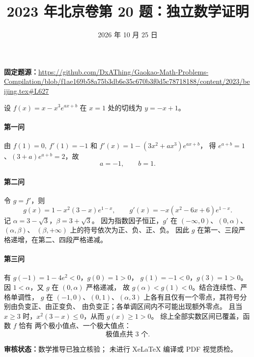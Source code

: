 \documentclass[UTF8,a4paper,11pt]{ctexart}
\title{2023 年北京卷第 20 题：独立数学证明}
\date{2026 年 10 月 25 日}
\begin{document}
\maketitle
\noindent\textbf{固定题源：}\url{https://github.com/DxAThing/Gaokao-Math-Problems-Compilation/blob/f1ae169b58a75b3db6e35c670b3f0d5c78718188/content/2023/beijing.tex#L627}

设 $f(x)=x-x^3e^{ax+b}$ 在 $x=1$ 处的切线为 $y=-x+1$。
\paragraph{第一问}
由 $f(1)=0,\ f'(1)=-1$ 和
$f'(x)=1-(3x^2+ax^3)e^{ax+b}$，
得 $e^{a+b}=1$、$(3+a)e^{a+b}=2$，故
\[\boxed{a=-1,\qquad b=1}.\]
\paragraph{第二问}
令 $g=f'$，则
\[
g(x)=1-x^2(3-x)e^{1-x},\qquad
g'(x)=-x(x^2-6x+6)e^{1-x}.
\]
记 $\alpha=3-\sqrt3$，$\beta=3+\sqrt3$。
因为指数因子恒正，$g'$ 在
$(-\infty,0)$、$(0,\alpha)$、$(\alpha,\beta)$、
$(\beta,+\infty)$ 上的符号依次为正、负、正、负。
因此 $g$ 在第一、三段严格递增，在第二、四段严格递减。

\paragraph{第三问}
有 $g(-1)=1-4e^2<0$，$g(0)=1>0$，
$g(1)=-1<0$，$g(3)=1>0$。
因 $1<\alpha$，又 $g$ 在 $(0,\alpha)$ 严格递减，
故 $g(\alpha)<g(1)<0$。结合连续性、严格单调性，
$g$ 在 $(-1,0)$、$(0,1)$、$(\alpha,3)$
上各有且仅有一个零点，其符号分别由负变正、由正变负、
由负变正；各单调区间内不可能出现额外零点。
且当 $x\ge3$ 时，$x^2(3-x)\le0$，从而 $g(x)\ge1>0$。
综上全部实数区间已覆盖，函数 $f$ 恰有
两个极小值点、一个极大值点：
\[
\boxed{\text{极值点共 }3\text{ 个}}.
\]

\noindent\textbf{审核状态：}数学推导已独立核验；
未进行 XeLaTeX 编译或 PDF 视觉质检。
\end{document}

